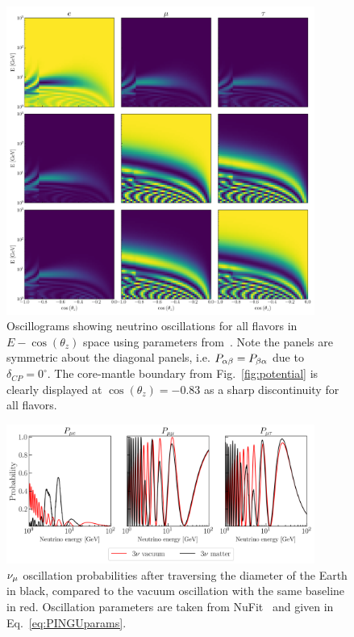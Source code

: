 \begin{figure}
    \centering
    \includegraphics[width=0.9\textwidth]{figures/oscillograms.pdf}
    \caption{Oscillograms showing neutrino oscillations for all flavors in $E - \cos(\theta_z)$ space using parameters from~\cite{nufit}. Note the panels are symmetric about the diagonal panels, i.e. $P_{\alpha\beta} = P_{\beta\alpha}$ due to $\delta_{CP} = 0^\circ$. The core-mantle boundary from Fig.~\ref{fig:potential} is clearly displayed at $\cos{(\theta_z)} = -0.83$ as a sharp discontinuity for all flavors.}\label{fig:oscillograms}%
\end{figure}

\begin{figure}
    \centering
    \includegraphics[width=0.9\textwidth]{figures/vac_vs_matter.png}
    \caption{$\nu_\mu$ oscillation probabilities after traversing the diameter of the Earth in black, 
    compared to the vacuum oscillation with the same 
    baseline in red. 
    Oscillation parameters are taken from NuFit~\cite{nufit} and given in Eq.~\ref{eq:PINGUparams}.}\label{fig:vac_vs_matter}
\end{figure}

